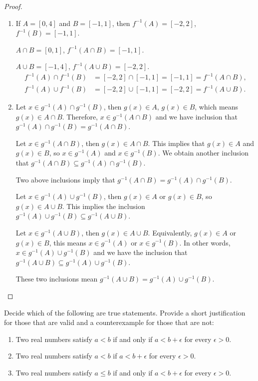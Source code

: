 \documentclass[class=understanding-analysis,crop=false]{standalone}
\begin{document}
\begin{proof}
    \begin{enumerate}[label = (\alph*)]
        \item If $A = [0, 4]$ and $B = [-1, 1]$, then $f^{-1}(A) = [-2, 2]$, $f^{-1}(B) = [-1, 1]$.
              \par $A\cap B = [0, 1]$, $f^{-1}(A\cap B) = [-1, 1]$.
              \par $A\cup B = [-1, 4]$, $f^{-1}(A\cup B) = [-2, 2]$.
              \begin{align*}
                  f^{-1}(A)\cap f^{-1}(B) & = [-2, 2]\cap [-1, 1] = [-1, 1] = f^{-1}(A\cap B), \\
                  f^{-1}(A)\cup f^{-1}(B) & = [-2, 2]\cup [-1, 1] = [-2, 2] = f^{-1}(A\cup B).
              \end{align*}
        \item Let $x\in g^{-1}(A)\cap g^{-1}(B)$, then $g(x)\in A$, $g(x)\in B$, which means $g(x)\in A\cap B$. Therefore, $x\in g^{-1}(A\cap B)$ and we have inclusion that $g^{-1}(A)\cap g^{-1}(B) = g^{-1}(A\cap B)$.
              \par Let $x\in g^{-1}(A\cap B)$, then $g(x) \in A\cap B$. This implies that $g(x)\in A$ and $g(x)\in B$, so $x\in g^{-1}(A)$ and $x\in g^{-1}(B)$. We obtain another inclusion that $g^{-1}(A\cap B)\subseteq g^{-1}(A) \cap g^{-1}(B)$.
              \par Two above inclusions imply that $g^{-1}(A\cap B) = g^{-1}(A) \cap g^{-1}(B)$.
              \bigskip
              \par Let $x\in g^{-1}(A)\cup g^{-1}(B)$, then $g(x)\in A$ or $g(x)\in B$, so $g(x)\in A\cup B$. This implies the inclusion $g^{-1}(A)\cup g^{-1}(B) \subseteq g^{-1}(A\cup B)$.
              \par Let $x\in g^{-1}(A\cup B)$, then $g(x)\in A\cup B$. Equivalently, $g(x)\in A$ or $g(x)\in B$, this means $x\in g^{-1}(A)$ or $x\in g^{-1}(B)$. In other words, $x\in g^{-1}(A)\cup g^{-1}(B)$ and we have the inclusion that $g^{-1}(A\cup B)\subseteq g^{-1}(A) \cup g^{-1}(B)$.
              \par These two inclusions mean $g^{-1}(A\cup B) = g^{-1}(A)\cup g^{-1}(B)$.
    \end{enumerate}
\end{proof}

\begin{exercise}
    \par Decide which of the following are true statements. Provide a short justification for those that are valid and a counterexample for those that are not:
    \begin{enumerate}[label = (\alph*)]
        \item Two real numbers satisfy $a < b$ if and only if $a < b + \epsilon$ for every $\epsilon > 0$.
        \item Two real numbers satisfy $a < b$ if $a < b + \epsilon$ for every $\epsilon > 0$.
        \item Two real numbers satisfy $a\le b$ if and only if $a < b + \epsilon$ for every $\epsilon > 0$.
    \end{enumerate}
\end{exercise}
\end{document}
